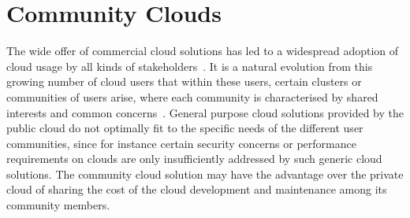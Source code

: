 

\section{Community Clouds}
\label{sec:background}

The wide offer of commercial cloud solutions has led to a widespread adoption of cloud usage by all kinds of stakeholders~\cite{Buyya2011CloudComputing}. 
It is a natural evolution from this growing number of cloud users that within these users, certain clusters or communities of users arise, where each community is characterised by shared interests and common concerns~\cite{Khan2015CommunityClouds}. 
General purpose cloud solutions provided by the public cloud do not optimally fit to the specific needs of the different user communities, since for instance certain security concerns or performance requirements on clouds are only insufficiently addressed by such generic cloud solutions. 
The community cloud solution may have the advantage over the private cloud of sharing the cost of the cloud development and maintenance among its community members. 

